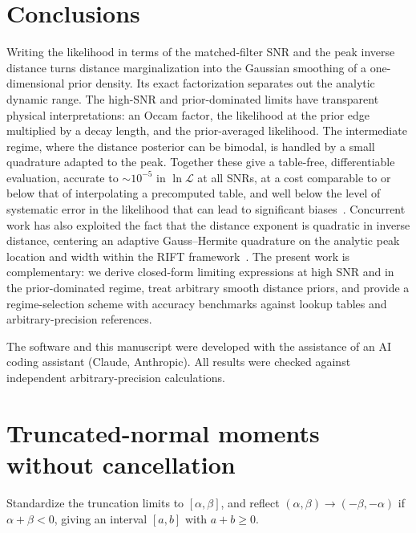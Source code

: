 \documentclass[prd,twocolumn,nofootinbib,superscriptaddress,amsmath,amssymb]{revtex4-2}
\begin{document}
\section{Conclusions}

Writing the likelihood in terms of the matched-filter SNR and the peak inverse distance turns distance marginalization into the Gaussian smoothing of a one-dimensional prior density.
Its exact factorization separates out the analytic dynamic range.
The high-SNR and prior-dominated limits have transparent physical interpretations: an Occam factor,
the likelihood at the prior edge multiplied by a decay length,
and the prior-averaged likelihood.
The intermediate regime,
where the distance posterior can be bimodal,
is handled by a small quadrature adapted to the peak.
Together these give a table-free,
differentiable evaluation,
accurate to $\sim10^{-5}$ in $\ln\mathcal{L}$ at all SNRs,
at a cost comparable to or below that of interpolating a precomputed table,
and well below the level of systematic error in the likelihood that can lead to significant biases~\cite{2023MNRAS.526.3495T,2025arXiv250907221H}.
Concurrent work has also exploited the fact that the distance exponent is quadratic in inverse distance,
centering an adaptive Gauss--Hermite quadrature on the analytic peak location and width within the RIFT framework~\cite{2026arXiv260937393O}.
The present work is complementary:
we derive closed-form limiting expressions at high SNR and in the prior-dominated regime,
treat arbitrary smooth distance priors, and provide a regime-selection scheme with accuracy benchmarks against lookup tables and arbitrary-precision references.

\begin{acknowledgments}
The software and this manuscript were developed with the assistance of an AI coding assistant (Claude,
Anthropic).
All results were checked against independent arbitrary-precision calculations.
\end{acknowledgments}

\appendix

\section{Truncated-normal moments without cancellation}
\label{app:tn}

Standardize the truncation limits to $[\alpha,\beta]$,
and reflect $(\alpha,\beta)\to(-\beta,-\alpha)$ if $\alpha+\beta<0$,
giving an interval $[a,b]$ with $a+b\ge0$.
\end{document}
